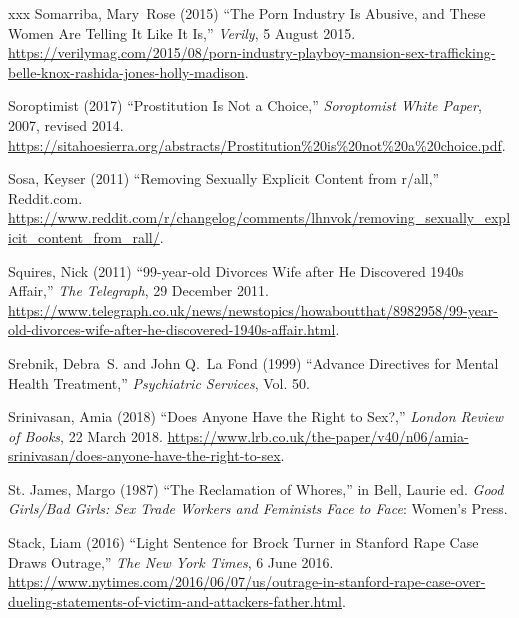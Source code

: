 \documentclass[]{jlreq} \usepackage{mystyle}
\begin{document}
\begin{thebibliography}{xxx}
Somarriba, Mary~Rose (2015) ``The Porn Industry Is Abusive, and These Women Are
  Telling It Like It Is,'' \emph{Verily}, 5 August 2015.
  \url{https://verilymag.com/2015/08/porn-industry-playboy-mansion-sex-trafficking-belle-knox-rashida-jones-holly-madison}.

Soroptimist (2017) ``Prostitution Is Not a Choice,'' \emph{Soroptomist White
  Paper}, 2007, revised 2014.
  \url{https://sitahoesierra.org/abstracts/Prostitution%20is%20not%20a%20choice.pdf}.

Sosa, Keyser (2011) ``Removing Sexually Explicit Content from r/all,''
  Reddit.com.
  \url{https://www.reddit.com/r/changelog/comments/lhnvok/removing_sexually_explicit_content_from_rall/}.

Squires, Nick (2011) ``99-year-old Divorces Wife after He Discovered 1940s
  Affair,'' \emph{The Telegraph}, 29 December 2011.
  \url{https://www.telegraph.co.uk/news/newstopics/howaboutthat/8982958/99-year-old-divorces-wife-after-he-discovered-1940s-affair.html}.

Srebnik, Debra~S. and John Q.~La Fond (1999) ``Advance Directives for Mental
  Health Treatment,'' \textit{ Psychiatric Services}, Vol. 50.

Srinivasan, Amia (2018) ``Does Anyone Have the Right to Sex?,'' \emph{London
  Review of Books}, 22 March 2018.
  \url{https://www.lrb.co.uk/the-paper/v40/n06/amia-srinivasan/does-anyone-have-the-right-to-sex}.

{St. James}, Margo (1987) ``The Reclamation of Whores,'' in Bell, Laurie ed.
  \textit{ Good Girls/Bad Girls: Sex Trade Workers and Feminists Face to Face}:
  Women's Press.

Stack, Liam (2016) ``Light Sentence for Brock Turner in Stanford Rape Case
  Draws Outrage,'' \emph{The New York Times}, 6 June 2016.
  \url{https://www.nytimes.com/2016/06/07/us/outrage-in-stanford-rape-case-over-dueling-statements-of-victim-and-attackers-father.html}.


\end{thebibliography}
\end{document}
